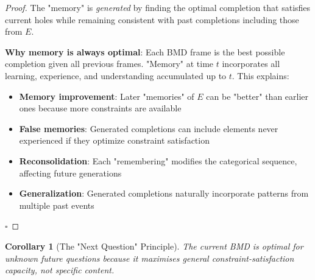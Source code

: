 \documentclass[11pt,a4paper]{article}
\newtheorem{corollary}[theorem]{Corollary}
\begin{document}
\begin{proof}
The "memory" is \textit{generated} by finding the optimal completion that satisfies current holes while remaining consistent with past completions including those from $E$.

\textbf{Why memory is always optimal}: Each BMD frame is the best possible completion given all previous frames. "Memory" at time $t$ incorporates all learning, experience, and understanding accumulated up to $t$. This explains:
\begin{itemize}
\item \textbf{Memory improvement}: Later "memories" of $E$ can be "better" than earlier ones because more constraints are available
\item \textbf{False memories}: Generated completions can include elements never experienced if they optimize constraint satisfaction
\item \textbf{Reconsolidation}: Each "remembering" modifies the categorical sequence, affecting future generations
\item \textbf{Generalization}: Generated completions naturally incorporate patterns from multiple past events
\end{itemize}

$\square$
\end{proof}

\begin{corollary}[The "Next Question" Principle]
\label{cor:next_question}
The current BMD is optimal for unknown future questions because it maximises general constraint-satisfaction capacity, not specific content.
\end{corollary}
\end{document}
